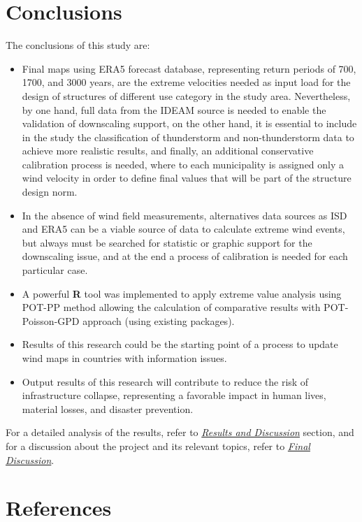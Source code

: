 \documentclass[12pt,twoside]{reedthesis}
\begin{document}
\hypertarget{conclusions}{%
\chapter{Conclusions}\label{conclusions}}

The conclusions of this study are:
\begin{itemize}
\item
  Final maps using ERA5 forecast database, representing return periods of 700, 1700, and 3000 years, are the extreme velocities needed as input load for the design of structures of different use category in the study area. Nevertheless, by one hand, full data from the IDEAM source is needed to enable the validation of downscaling support, on the other hand, it is essential to include in the study the classification of thunderstorm and non-thunderstorm data to achieve more realistic results, and finally, an additional conservative calibration process is needed, where to each municipality is assigned only a wind velocity in order to define final values that will be part of the structure design norm.
\item
  In the absence of wind field measurements, alternatives data sources as ISD and ERA5 can be a viable source of data to calculate extreme wind events, but always must be searched for statistic or graphic support for the downscaling issue, and at the end a process of calibration is needed for each particular case.
\item
  A powerful \textbf{R} tool was implemented to apply extreme value analysis using POT-PP method allowing the calculation of comparative results with POT-Poisson-GPD approach (using existing packages).
\item
  Results of this research could be the starting point of a process to update wind maps in countries with information issues.
\item
  Output results of this research will contribute to reduce the risk of infrastructure collapse, representing a favorable impact in human lives, material losses, and disaster prevention.
\end{itemize}
For a detailed analysis of the results, refer to \emph{\protect\hyperlink{rmd-results}{Results and Discussion}} section, and for a discussion about the project and its relevant topics, refer to \emph{\protect\hyperlink{fd}{Final Discussion}}.

\hypertarget{references}{%
\chapter*{References}\label{references}}
\end{document}
